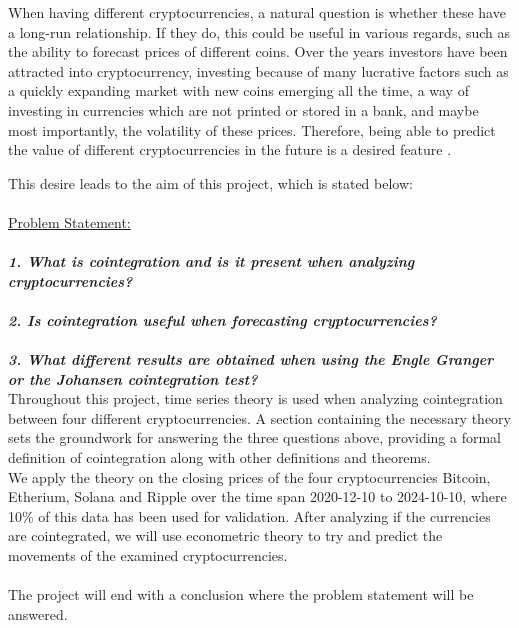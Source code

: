 When having different cryptocurrencies, a natural question is whether these have a long-run relationship. If they do, this could be useful in various regards, such as the ability to forecast prices of different coins. Over the years investors have been attracted into cryptocurrency, investing because of many lucrative factors such as a quickly expanding market with new coins emerging all the time, a way of investing in currencies which are not printed or stored in a bank, and maybe most importantly, the volatility of these prices. Therefore, being able to predict the value of different cryptocurrencies in the future is a desired feature \cite{investopedia.} \cite{Coinmarket}.


\newpage
This desire leads to the aim of this project, which is stated below:\\\\
\noindent\makebox[\linewidth]{\rule{\textwidth}{0.4pt}}
\underline{Problem Statement:}\\\\
\textbf{\textit{1. What is cointegration and is it present when analyzing cryptocurrencies?}}\\\\
\textbf{\textit{2. Is cointegration useful when forecasting cryptocurrencies?}}\\\\
\textbf{\textit{3. What different results are obtained when using the Engle Granger or the Johansen cointegration test?}}\\
\noindent\makebox[\linewidth]{\rule{\textwidth}{0.4pt}}
Throughout this project, time series theory is used when analyzing cointegration between four different cryptocurrencies. A section containing the necessary theory sets the groundwork for answering the three questions above, providing a formal definition of cointegration along with other definitions and theorems.\\
We apply the theory on the closing prices of the four cryptocurrencies Bitcoin, Etherium, Solana and Ripple over the time span 2020-12-10 to 2024-10-10, where 10\% of this data has been used for validation. After analyzing if the currencies are cointegrated, we will use econometric theory to try and predict the movements of the examined cryptocurrencies.\\\\
The project will end with a conclusion where the problem statement will be answered.




